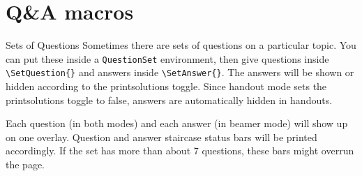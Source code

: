 \documentclass[10pt]{beamer}
\begin{document}
%
%
%
\section{Q\&A macros}
\frame{\tableofcontents[currentsection]}


\begin{frame}{Sets of Questions}
Sometimes there are sets of questions on a particular topic. You can put these inside a \texttt{QuestionSet} environment,  then give questions inside \texttt{\textbackslash SetQuestion\{\}} and  answers inside \texttt{\textbackslash SetAnswer\{\}}. The answers will be shown or hidden according to the printsolutions toggle. Since handout mode sets the printsolutions toggle to false, answers are automatically hidden in handouts.
\vfill

Each question (in both modes) and each answer (in beamer mode) will show up on one overlay. Question and answer staircase status bars will be printed accordingly. If the set has more than about 7 questions, these bars might overrun the page.
\end{frame}
\end{document}
